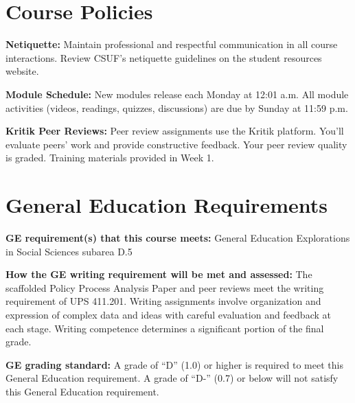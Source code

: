 \documentclass[12pt]{article}     %
\begin{document}
\section*{Course Policies}
\noindent \textbf{Netiquette:} Maintain professional and respectful communication in all course interactions. Review CSUF's netiquette guidelines on the student resources website.

\vspace{0.5em}
\noindent \textbf{Module Schedule:} New modules release each Monday at 12:01 a.m. All module activities (videos, readings, quizzes, discussions) are due by Sunday at 11:59 p.m.

\vspace{0.5em}
\noindent \textbf{Kritik Peer Reviews:} Peer review assignments use the Kritik platform. You'll evaluate peers' work and provide constructive feedback. Your peer review quality is graded. Training materials provided in Week 1.

\section*{General Education Requirements}
\noindent \textbf{GE requirement(s) that this course meets:} General Education Explorations in Social Sciences subarea D.5

\vspace{0.5em}
\noindent \textbf{How the GE writing requirement will be met and assessed:}
The scaffolded Policy Process Analysis Paper and peer reviews meet the writing requirement of UPS 411.201. Writing assignments involve organization and expression of complex data and ideas with careful evaluation and feedback at each stage. Writing competence determines a significant portion of the final grade.

\vspace{0.5em}
\noindent \textbf{GE grading standard:}
A grade of ``D'' (1.0) or higher is required to meet this General Education requirement. A grade of ``D-'' (0.7) or below will not satisfy this General Education requirement.
\end{document}
